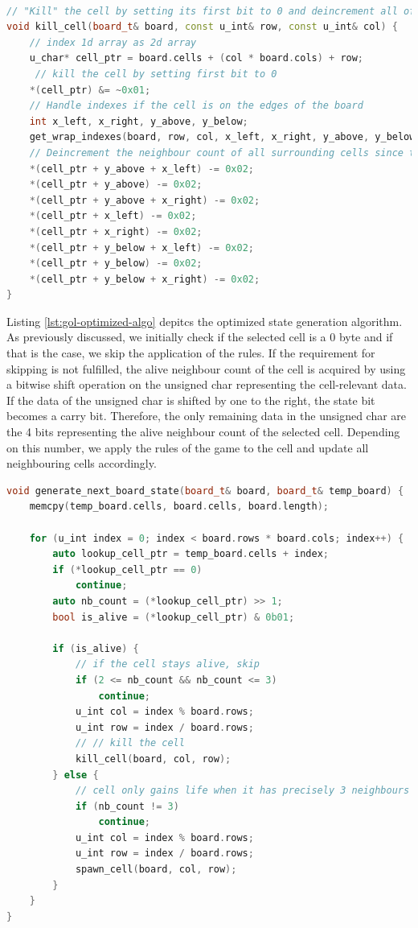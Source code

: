 \documentclass[a4paper,german,12pt,twoside=false]{scrartcl} %
\begin{document}
\begin{lstlisting}[caption={Parallel Naive State Generation Algorithm},label={lst:gol-optimized-manipulation},language=C++]

// "Kill" the cell by setting its first bit to 0 and deincrement all of its 8 neighbours living cell counts by one
void kill_cell(board_t& board, const u_int& row, const u_int& col) {
    // index 1d array as 2d array
    u_char* cell_ptr = board.cells + (col * board.cols) + row;
     // kill the cell by setting first bit to 0
    *(cell_ptr) &= ~0x01;
    // Handle indexes if the cell is on the edges of the board
    int x_left, x_right, y_above, y_below;
    get_wrap_indexes(board, row, col, x_left, x_right, y_above, y_below);
    // Deincrement the neighbour count of all surrounding cells since the cell died
    *(cell_ptr + y_above + x_left) -= 0x02;
    *(cell_ptr + y_above) -= 0x02;
    *(cell_ptr + y_above + x_right) -= 0x02;
    *(cell_ptr + x_left) -= 0x02;
    *(cell_ptr + x_right) -= 0x02;
    *(cell_ptr + y_below + x_left) -= 0x02;
    *(cell_ptr + y_below) -= 0x02;
    *(cell_ptr + y_below + x_right) -= 0x02;
}
\end{lstlisting}

Listing \ref{lst:gol-optimized-algo} depitcs the optimized state generation algorithm. As previously discussed, we initially check if the selected cell is a 0 byte and if that is the case, we skip the application of the rules. If the requirement for skipping is not fulfilled, the alive neighbour count of the cell is acquired by using a bitwise shift operation on the unsigned char representing the cell-relevant data. If the data of the unsigned char is shifted by one to the right, the state bit becomes a carry bit. Therefore, the only remaining data in the unsigned char are the 4 bits representing the alive neighbour count of the selected cell. Depending on this number, we apply the rules of the game to the cell and update all neighbouring cells accordingly.

\begin{lstlisting}[caption={Parallel Naive State Generation Algorithm},label={lst:gol-optimized-algo},language=C++]
void generate_next_board_state(board_t& board, board_t& temp_board) {
    memcpy(temp_board.cells, board.cells, board.length);

    for (u_int index = 0; index < board.rows * board.cols; index++) {
        auto lookup_cell_ptr = temp_board.cells + index;
        if (*lookup_cell_ptr == 0)
            continue;
        auto nb_count = (*lookup_cell_ptr) >> 1;
        bool is_alive = (*lookup_cell_ptr) & 0b01;

        if (is_alive) {
            // if the cell stays alive, skip
            if (2 <= nb_count && nb_count <= 3)
                continue;
            u_int col = index % board.rows;
            u_int row = index / board.rows;
            // // kill the cell
            kill_cell(board, col, row);
        } else {
            // cell only gains life when it has precisely 3 neighbours
            if (nb_count != 3)
                continue;
            u_int col = index % board.rows;
            u_int row = index / board.rows;
            spawn_cell(board, col, row);
        }
    }
}
\end{lstlisting}
\end{document}
